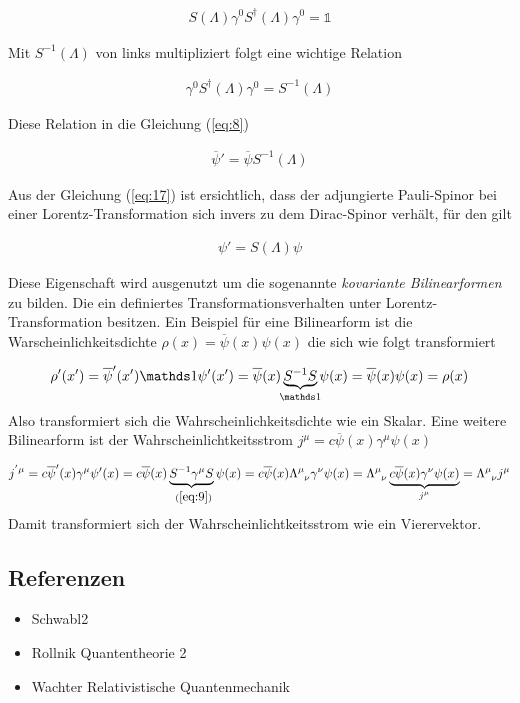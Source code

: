 \begin{align}
  \label{eq:15}
  S(\Lambda)  \gamma^0 S^\dagger(\Lambda) \gamma^0 = \mathds 1
\end{align}

Mit \(S^{-1}(\Lambda)\) von links multipliziert folgt eine wichtige Relation

\begin{align}
  \label{eq:16}
  \boxed{ \gamma^0 S^\dagger(\Lambda) \gamma^0 = S^{-1}(\Lambda) }
\end{align}

Diese Relation in die Gleichung (\ref{eq:8})

\begin{align}
  \label{eq:17}
  \boxed{ \overline \psi' =  \overline\psi S^{-1}(\Lambda) }
\end{align}

Aus der Gleichung (\ref{eq:17}) ist ersichtlich, dass der adjungierte Pauli-Spinor bei einer Lorentz-Transformation sich invers zu dem Dirac-Spinor verhält, für den gilt

\begin{align}
  \label{eq:18}
  \psi' = S(\Lambda)\psi
\end{align}

Diese Eigenschaft wird ausgenutzt um die sogenannte \textit{kovariante Bilinearformen} zu bilden. Die ein definiertes Transformationsverhalten unter Lorentz-Transformation besitzen. Ein Beispiel für eine Bilinearform ist die Warscheinlichkeitsdichte \(\rho(x) = \overline{\psi}(x)\psi(x)\) die sich wie folgt transformiert

\begin{align}
  \label{eq:19}
  \rho'(x') = \overline \psi'(x') \mathds 1 \psi'(x') =\overline \psi(x)\underbr{S^{-1}S}_{\mathds 1} \psi(x) = \overline \psi(x)\psi(x) = \rho(x)
\end{align}
Also transformiert sich die Wahrscheinlichkeitsdichte wie ein Skalar. Eine weitere Bilinearform ist der Wahrscheinlichtkeitsstrom \(j^\mu = c\overline\psi(x) \gamma^\mu \psi(x) \)

\begin{align}
  \label{eq:20}
  j^{'\mu} = c\overline\psi'(x) \gamma^\mu \psi'(x) =  c\overline\psi(x)\underbr{ S^{-1} \gamma^\mu S}_{~(\ref{eq:9})}\psi(x) =c\overline\psi(x) \Lambda^{\mu}_{\hphantom \mu \nu} \gamma^\nu\psi(x) =\Lambda^{\mu}_{\hphantom \mu \nu}\underbr{ c\overline\psi(x) \gamma^\nu\psi(x)}_{j^{\mu}} = \Lambda^{\mu}_{\hphantom \mu \nu}j^{\mu}
\end{align}
Damit transformiert sich der Wahrscheinlichtkeitsstrom wie ein Vierervektor.


\subsection*{Referenzen}
\begin{itemize}
\item Schwabl2
\item Rollnik Quantentheorie 2
\item Wachter Relativistische Quantenmechanik
\end{itemize}


